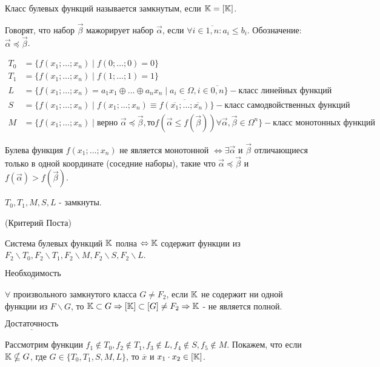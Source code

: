\opr Класс булевых функций называется замкнутым, если $\mathbb{K} = [\mathbb{K}]$.

Говорят, что набор $\vec{\beta}$ мажорирует набор $\vec{\alpha}$, если $\forall i \in \overline{1, n}: a_i \leq b_i$. Обозначение: $\vec{\alpha} \preccurlyeq \vec{\beta}$.

\examplei
\begin{align*}
    T_0 &= \{f(x_1; \dots; x_n) \mid f(0; \dots; 0) = 0\}\\
    T_1 &= \{f(x_1; \dots; x_n) \mid f(1; \dots; 1) = 1\}\\
    L   &= \{f(x_1; \dots; x_n) = a_1x_1 \oplus \ldots \oplus a_nx_n \mid a_i \in \Omega, i \in \overline{0, n}\} - \text{класс линейных функций}\\
    S   &= \{f(x_1; \dots; x_n) \mid f(x_1; \dots; x_n) \equiv \overline{f(\overline{x_1}; \dots; \overline{x_n})} \} - \text{класс самодвойственных функций} \\
    M   &= \{f(x_1; \dots; x_n) \mid \text{верно } \vec{\alpha} \preccurlyeq \vec{\beta}, \text{то} f(\vec{\alpha} \leq f(\vec{\beta})) \forall \vec{\alpha}, \vec{\beta} \in \Omega^n\} - \text{класс монотонных функций}
\end{align*}

\lem Булева функция $f(x_1; \dots; x_n)$ не является монотонной $\Leftrightarrow \exists \vec{\alpha}$ и $\vec{\beta}$ отличающиеся
только в одной координате (соседние наборы), такие что $\vec{\alpha} \preccurlyeq \vec{\beta}$ и $f(\vec{\alpha}) > f(\vec{\beta})$.

\thr $T_0, T_1, M, S, L$ - замкнуты.

\thr (Критерий Поста)

Система булевых функций $\mathbb{K}$ полна $\Leftrightarrow \mathbb{K}$ содержит функции из $F_2 \backslash T_0, F_2 \backslash T_1, F_2 \backslash M, F_2 \backslash S, F_2 \backslash L$.

\proof 

    $\underline{\text{Необходимость}}$

    $\forall$ произвольного замкнутого класса $G \neq F_2$, если $\mathbb{K}$ не содержит ни одной функции из $F \backslash G$, то $\mathbb{K} \subset G \Rightarrow [\mathbb{K}] \subset [G] \neq F_2 \Rightarrow \mathbb{K}$ - не
является полной.

    $\underline{\text{Достаточность}}$

    Рассмотрим функции $f_1 \notin T_0, f_2 \notin T_1, f_3 \notin L, f_4 \notin S, f_5 \notin M$.
    Покажем, что если $\mathbb{K} \nsubseteq G$, где $G \in \{T_0, T_1, S, M, L\}$, то $\overline{x}$ и $x_1\cdot x_2 \in [\mathbb{K}]$.

